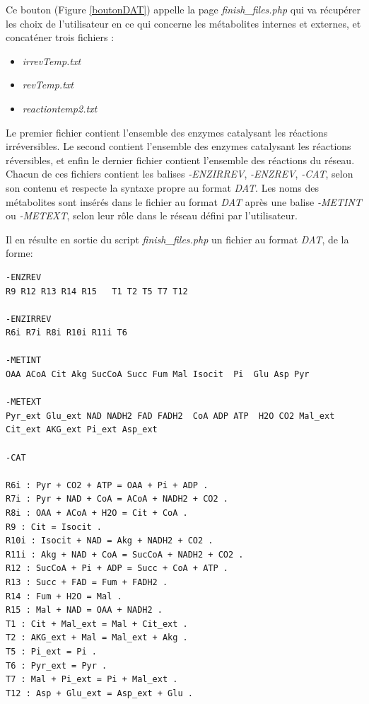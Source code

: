 Ce bouton (Figure \ref{boutonDAT}) appelle la page \emph{finish\_files.php} qui va  récupérer les choix de l'utilisateur en ce qui concerne les métabolites internes et externes, et concaténer trois fichiers :
\begin{itemize}
\item \emph{irrevTemp.txt}
\item \emph{revTemp.txt}
\item \emph{reactiontemp2.txt}
\end{itemize}

Le premier fichier contient l'ensemble des enzymes catalysant les réactions irréversibles. Le second contient l'ensemble des enzymes catalysant les réactions réversibles, et enfin le dernier fichier contient l'ensemble des réactions du réseau. \\
Chacun de ces fichiers contient les balises \emph{-ENZIRREV}, \emph{-ENZREV}, \emph{-CAT}, selon son contenu et respecte la syntaxe propre au format \emph{DAT}.
Les noms des métabolites sont insérés dans le fichier au format \emph{DAT} après une balise \emph{-METINT} ou \emph{-METEXT}, selon leur rôle dans le réseau défini par l'utilisateur.

Il en résulte en sortie du script \emph{finish\_files.php} un fichier au format \emph{DAT}, de la forme:
\\
\begin{DDbox}{\linewidth}
\begin{lstlisting}
-ENZREV
R9 R12 R13 R14 R15   T1 T2 T5 T7 T12

-ENZIRREV
R6i R7i R8i R10i R11i T6

-METINT
OAA ACoA Cit Akg SucCoA Succ Fum Mal Isocit  Pi  Glu Asp Pyr

-METEXT
Pyr_ext Glu_ext NAD NADH2 FAD FADH2  CoA ADP ATP  H2O CO2 Mal_ext Cit_ext AKG_ext Pi_ext Asp_ext

-CAT

R6i : Pyr + CO2 + ATP = OAA + Pi + ADP .
R7i : Pyr + NAD + CoA = ACoA + NADH2 + CO2 .
R8i : OAA + ACoA + H2O = Cit + CoA .
R9 : Cit = Isocit .
R10i : Isocit + NAD = Akg + NADH2 + CO2 .
R11i : Akg + NAD + CoA = SucCoA + NADH2 + CO2 .
R12 : SucCoA + Pi + ADP = Succ + CoA + ATP .
R13 : Succ + FAD = Fum + FADH2 .
R14 : Fum + H2O = Mal .
R15 : Mal + NAD = OAA + NADH2 .
T1 : Cit + Mal_ext = Mal + Cit_ext .
T2 : AKG_ext + Mal = Mal_ext + Akg .
T5 : Pi_ext = Pi .
T6 : Pyr_ext = Pyr .
T7 : Mal + Pi_ext = Pi + Mal_ext .
T12 : Asp + Glu_ext = Asp_ext + Glu .

\end{lstlisting}
\end{DDbox}

